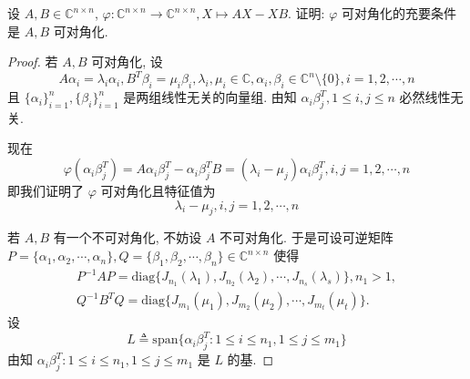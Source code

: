 \documentclass[../../main.tex]{subfiles}
\begin{document}
\begin{example}
设 $A, B \in \mathbb{C}^{n \times n}$, $\varphi : \mathbb{C}^{n \times n} \to \mathbb{C}^{n \times n}, X \mapsto AX - XB$. 证明: $\varphi$ 可对角化的充要条件是 $A, B$ 可对角化.
\end{example}
\begin{proof}
若 $A, B$ 可对角化, 设
$$A\alpha_i = \lambda_i \alpha_i, B^T \beta_i = \mu_i \beta_i, \lambda_i, \mu_i \in \mathbb{C}, \alpha_i, \beta_i \in \mathbb{C}^n \setminus \{0\}, i = 1, 2, \cdots, n$$
且 $\{\alpha_i\}_{i=1}^n, \{\beta_i\}_{i=1}^n$ 是两组线性无关的向量组. 由知 $\alpha_i \beta_j^T, 1 \leqslant  i, j \leqslant  n$ 必然线性无关.

现在
$$\varphi(\alpha_i \beta_j^T) = A\alpha_i \beta_j^T - \alpha_i \beta_j^T B = (\lambda_i - \mu_j) \alpha_i \beta_j^T, i, j = 1, 2, \cdots, n$$
即我们证明了 $\varphi$ 可对角化且特征值为
$$\lambda_i - \mu_j, i, j = 1, 2, \cdots, n$$

若 $A, B$ 有一个不可对角化, 不妨设 $A$ 不可对角化. 于是可设可逆矩阵 $P = \{\alpha_1, \alpha_2, \cdots, \alpha_n\}, Q = \{\beta_1, \beta_2, \cdots, \beta_n\} \in \mathbb{C}^{n \times n}$ 使得
\begin{gather*}
P^{-1}AP = \mathrm{diag}\{J_{n_1}(\lambda_1), J_{n_2}(\lambda_2), \cdots, J_{n_s}(\lambda_s)\}, n_1 > 1, \\
Q^{-1}B^T Q = \mathrm{diag}\{J_{m_1}(\mu_1), J_{m_2}(\mu_2), \cdots, J_{m_t}(\mu_t)\}.
\end{gather*}
设
$$L \triangleq \mathrm{span}\{\alpha_i \beta_j^T : 1 \leqslant  i \leqslant  n_1, 1 \leqslant  j \leqslant  m_1\}$$
由知 $\alpha_i \beta_j^T : 1 \leqslant  i \leqslant  n_1, 1 \leqslant  j \leqslant  m_1$ 是 $L$ 的基.


\end{proof}
\end{document}
